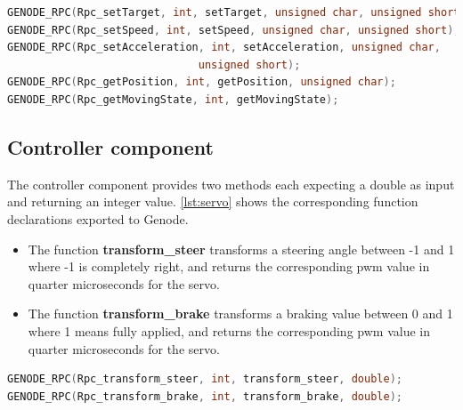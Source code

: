 \begin{lstlisting}[language=c, frame=single, basicstyle=\footnotesize,  label={lst:servo}, caption=Genode interface for servo component]
GENODE_RPC(Rpc_setTarget, int, setTarget, unsigned char, unsigned short);
GENODE_RPC(Rpc_setSpeed, int, setSpeed, unsigned char, unsigned short);
GENODE_RPC(Rpc_setAcceleration, int, setAcceleration, unsigned char, 
						      unsigned short);
GENODE_RPC(Rpc_getPosition, int, getPosition, unsigned char);
GENODE_RPC(Rpc_getMovingState, int, getMovingState);
\end{lstlisting}



\subsection{Controller component}
\label{sec:comp-controller}

The controller component provides two methods each expecting a double as input and returning an integer value.
\autoref{lst:servo} shows the corresponding function declarations exported to Genode.
\begin{itemize}
\item The function \textbf{transform\_steer} transforms a steering angle between -1 and 1 where -1 is completely right, and returns the corresponding pwm value in quarter microseconds for the servo.
\item The function \textbf{transform\_brake} transforms a braking value between 0 and 1 where 1 means fully applied, and returns the corresponding pwm value in quarter microseconds for the servo.
\end{itemize}

\begin{lstlisting}[language=c, frame=single, basicstyle=\footnotesize,  label={lst:controller}, caption=Genode interface for controller component]
GENODE_RPC(Rpc_transform_steer, int, transform_steer, double);
GENODE_RPC(Rpc_transform_brake, int, transform_brake, double);
\end{lstlisting}
